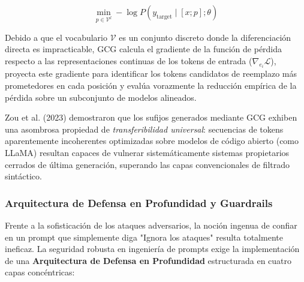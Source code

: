 \begin{equation}
\min_{p \in \mathcal{V}^l} -\log P(y_{\mathrm{target}} \mid [x; p]; \theta)
\end{equation}

Debido a que el vocabulario $\mathcal{V}$ es un conjunto discreto donde la diferenciación directa es impracticable, GCG calcula el gradiente de la función de pérdida respecto a las representaciones continuas de los tokens de entrada ($\nabla_{e_i} \mathcal{L}$), proyecta este gradiente para identificar los tokens candidatos de reemplazo más prometedores en cada posición y evalúa vorazmente la reducción empírica de la pérdida sobre un subconjunto de modelos alineados.

Zou et al. (2023) demostraron que los sufijos generados mediante GCG exhiben una asombrosa propiedad de \textit{transferibilidad universal}: secuencias de tokens aparentemente incoherentes optimizadas sobre modelos de código abierto (como LLaMA) resultan capaces de vulnerar sistemáticamente sistemas propietarios cerrados de última generación, superando las capas convencionales de filtrado sintáctico.

\subsubsection{Arquitectura de Defensa en Profundidad y Guardrails}

Frente a la sofisticación de los ataques adversarios, la noción ingenua de confiar en un prompt que simplemente diga "Ignora los ataques" resulta totalmente ineficaz. La seguridad robusta en ingeniería de prompts exige la implementación de una \textbf{Arquitectura de Defensa en Profundidad} estructurada en cuatro capas concéntricas:

